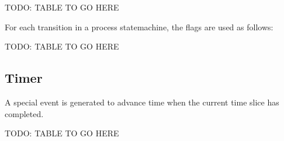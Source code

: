 TODO: TABLE TO GO HERE

For each transition in a process statemachine, the flags are used as follows:

TODO: TABLE TO GO HERE

\subsection{Timer}

A special event is generated to advance time when the current time slice has completed.

TODO: TABLE TO GO HERE

		



